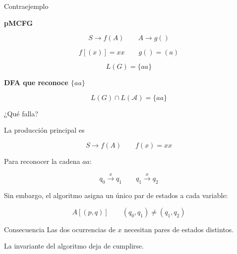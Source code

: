 \documentclass{beamer}
\begin{document}
\begin{frame}{Contraejemplo}

    \pause

    \textbf{pMCFG}

    \[
        S \rightarrow f(A)
        \quad \quad
        A \rightarrow g()
    \]

    \[
        f[(x)]=xx
        \qquad
        g()=(a)
    \]

    \pause

    \[
        L(G)=\{aa\}
    \]

    \vspace{0.3cm}

    \pause

    \textbf{DFA que reconoce $\{aa\}$}

    \begin{figure}[h]
        \centering
        \begin{otherlanguage}{english}
        \end{otherlanguage}
    \end{figure}

    \pause

    \[
        L(G)\cap L(\mathcal A)=\{aa\}
    \]

\end{frame}

\begin{frame}{¿Qué falla?}

    \pause

    La producción principal es

    \[
        S \rightarrow f(A)
        \qquad
        f(x)=xx
    \]

    \pause

    Para reconocer la cadena \(aa\):

    \[
        q_0 \xrightarrow{x} q_1
        \quad \quad
        q_1 \xrightarrow{x} q_2
    \]

    \pause

    Sin embargo, el algoritmo asigna un único par de estados a cada variable:

    \[
        A[(p,q)]
        \quad \quad
        (q_0,q_1)\neq(q_1,q_2)
    \]

    \vspace{0.4cm}

    \pause

    \begin{block}{Consecuencia}
        Las dos ocurrencias de \(x\) necesitan pares de estados distintos.

        La invariante del algoritmo deja de cumplirse.
    \end{block}

\end{frame}
\end{document}
